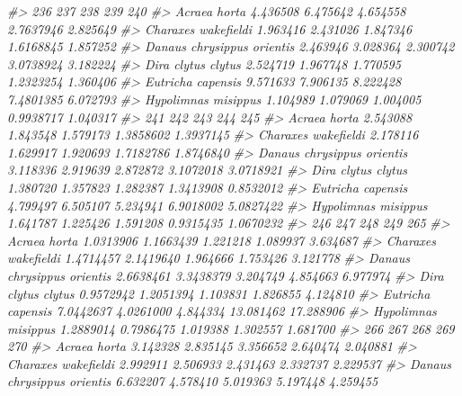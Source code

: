 \documentclass[
]{article}
\newenvironment{Shaded}{\begin{snugshade}}{\end{snugshade}}
\newcommand{\CommentTok}[1]{\textcolor[rgb]{0.56,0.35,0.01}{\textit{#1}}}
\begin{document}
\begin{Shaded}
\begin{Highlighting}[]
\CommentTok{\#\textgreater{}                                 236      237      238       239      240}
\CommentTok{\#\textgreater{} Acraea horta               4.436508 6.475642 4.654558 2.7637946 2.825649}
\CommentTok{\#\textgreater{} Charaxes wakefieldi        1.963416 2.431026 1.847346 1.6168845 1.857252}
\CommentTok{\#\textgreater{} Danaus chrysippus orientis 2.463946 3.028364 2.300742 3.0738924 3.182224}
\CommentTok{\#\textgreater{} Dira clytus clytus         2.524719 1.967748 1.770595 1.2323254 1.360406}
\CommentTok{\#\textgreater{} Eutricha capensis          9.571633 7.906135 8.222428 7.4801385 6.072793}
\CommentTok{\#\textgreater{} Hypolimnas misippus        1.104989 1.079069 1.004005 0.9938717 1.040317}
\CommentTok{\#\textgreater{}                                 241      242      243       244       245}
\CommentTok{\#\textgreater{} Acraea horta               2.543088 1.843548 1.579173 1.3858602 1.3937145}
\CommentTok{\#\textgreater{} Charaxes wakefieldi        2.178116 1.629917 1.920693 1.7182786 1.8746840}
\CommentTok{\#\textgreater{} Danaus chrysippus orientis 3.118336 2.919639 2.872872 3.1072018 3.0718921}
\CommentTok{\#\textgreater{} Dira clytus clytus         1.380720 1.357823 1.282387 1.3413908 0.8532012}
\CommentTok{\#\textgreater{} Eutricha capensis          4.799497 6.505107 5.234941 6.9018002 5.0827422}
\CommentTok{\#\textgreater{} Hypolimnas misippus        1.641787 1.225426 1.591208 0.9315435 1.0670232}
\CommentTok{\#\textgreater{}                                  246       247      248       249       265}
\CommentTok{\#\textgreater{} Acraea horta               1.0313906 1.1663439 1.221218  1.089937  3.634687}
\CommentTok{\#\textgreater{} Charaxes wakefieldi        1.4714457 2.1419640 1.964666  1.753426  3.121778}
\CommentTok{\#\textgreater{} Danaus chrysippus orientis 2.6638461 3.3438379 3.204749  4.854663  6.977974}
\CommentTok{\#\textgreater{} Dira clytus clytus         0.9572942 1.2051394 1.103831  1.826855  4.124810}
\CommentTok{\#\textgreater{} Eutricha capensis          7.0442637 4.0261000 4.844334 13.081462 17.288906}
\CommentTok{\#\textgreater{} Hypolimnas misippus        1.2889014 0.7986475 1.019388  1.302557  1.681700}
\CommentTok{\#\textgreater{}                                  266       267       268       269       270}
\CommentTok{\#\textgreater{} Acraea horta                3.142328  2.835145  3.356652  2.640474  2.040881}
\CommentTok{\#\textgreater{} Charaxes wakefieldi         2.992911  2.506933  2.431463  2.332737  2.229537}
\CommentTok{\#\textgreater{} Danaus chrysippus orientis  6.632207  4.578410  5.019363  5.197448  4.259455}

\end{Highlighting}
\end{Shaded}
\end{document}
